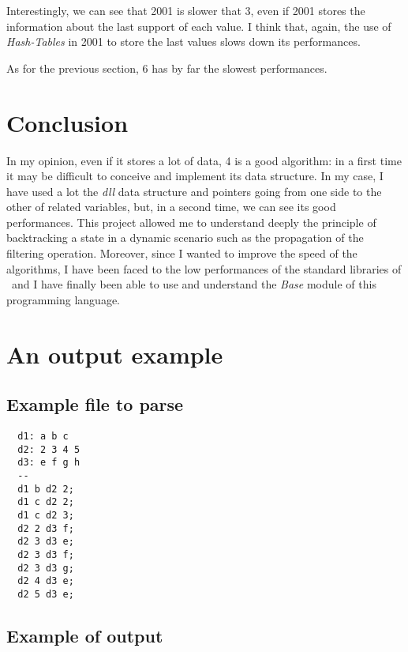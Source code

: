 \documentclass{rapport}
\begin{document}
Interestingly, we can see that \ac{2001} is slower that \ac{3}, even if \ac{2001} stores the information about the last support of each value. I think that, again, the use of \textit{Hash-Tables} in \ac{2001} to store the last values slows down its performances.

As for the previous section, \ac{6} has by far the slowest performances.

\section{Conclusion}

In my opinion, even if it stores a lot of data, \ac{4} is a good algorithm: in a first time it may be difficult to conceive and implement its data structure. In my case, I have used a lot the \textit{dll} data structure and pointers going from one side to the other of related variables, but, in a second time, we can see its good performances. This project allowed me to understand deeply the principle of backtracking a state in a dynamic scenario such as the propagation of the filtering operation. Moreover, since I wanted to improve the speed of the algorithms, I have been faced to the low performances of the standard libraries of \ml\ and I have finally been able to use and understand the \textit{Base} module of this programming language.

\newpage

\appendix

\section{An output example}

\subsection{Example file to parse}
\label{sec:input_ex}
\begin{verbatim}
  d1: a b c 
  d2: 2 3 4 5
  d3: e f g h
  --
  d1 b d2 2;
  d1 c d2 2;
  d1 c d2 3;
  d2 2 d3 f;
  d2 3 d3 e;
  d2 3 d3 f;
  d2 3 d3 g;
  d2 4 d3 e;
  d2 5 d3 e;
\end{verbatim}


\subsection{Example of output}
\label{sec:output_ex}
\end{document}

